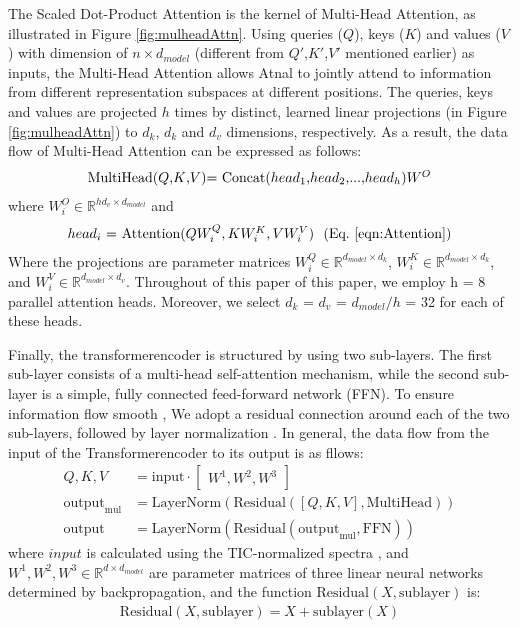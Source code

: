 \documentclass[journal=jacsat,manuscript=article]{achemso}
\begin{document}
The Scaled Dot-Product Attention is the kernel of Multi-Head Attention, as illustrated in Figure \ref{fig:mulheadAttn}. 
Using queries ($Q$), keys ($K$) and values ($V$) with dimension of $n \times d_{model}$ (different from $Q'$,$K'$,$V'$ mentioned earlier) as inputs,
the Multi-Head Attention allows Atnal to jointly attend to information from different representation subspaces 
at different positions. The queries, 
keys and values are projected  $h$ times by distinct, learned linear projections (in Figure \ref{fig:mulheadAttn})
to $d_k$, $d_k$ and $d_v$ dimensions, respectively. 
As a result, the data flow of Multi-Head Attention can be expressed as follows:
\begin{equation}
  \begin{minipage}[c]{0.80\linewidth}
    \centering
    MultiHead($Q$,$K$,$V$)= Concat($head_1$,$head_2$,...,$head_h$)$W^O $              \\
  \end{minipage}
  \label{eqn:MultiHeadAttn}
\end{equation}
where $W_i^O \in \mathbb{R}^{hd_v \times d_{model}}$ and 
\begin{equation}
  \begin{minipage}[c]{0.80\linewidth}
    \centering
    $head_i$ = Attention($QW_i^Q,KW_i^K,VW_i^V$) \,\,(Eq.~\ref{eqn:Attention})
  \end{minipage}
\end{equation}
Where the projections are parameter matrices 
$W_i^Q \in \mathbb{R}^{d_{model} \times d_k}$,
$W_i^K \in \mathbb{R}^{d_{model} \times d_k}$, and
$W_i^V \in \mathbb{R}^{d_{model} \times d_v}$. 
Throughout of this paper of this paper, we employ h = 8 parallel attention heads. Moreover, 
we select $d_k$ = $d_v$ = $d_{model}/h$ = 32 for each of these heads. 

Finally, the transformerencoder is structured by using two sub-layers. The first sub-layer 
consists of a multi-head self-attention mechanism, 
while the second sub-layer is a simple, fully connected feed-forward network (FFN). 
To ensure information flow smooth , 
We adopt a residual connection \cite{he2016deep} around each of the two sub-layers, 
followed by layer normalization \cite{hochreiter2001gradient}.
In general, the data flow from the input
of the Transformerencoder to its output is as fllows:
\begin{align}
  Q,K,V &= \text{input} \cdot \begin{bmatrix} W^1,W^2,W^3 \end{bmatrix} \\
  \text{output}_{\text{mul}} &= \text{LayerNorm}(\text{Residual}([Q,K,V],\text{MultiHead})) \\
  \text{output} &= \text{LayerNorm}(\text{Residual}(\text{output}_{\text{mul}},\text{FFN}))
\end{align}
where $input $ is calculated using the TIC-normalized spectra , and $W^1,W^2,W^3 \in \mathbb{R}^{d \times d_{model}}$  
are parameter matrices of three linear neural networks determined by 
backpropagation, and the function $\mathrm{Residual}(X,\text{sublayer})$ is:
\begin{align}
 \mathrm{Residual}(X,\text{sublayer}) = X + \text{sublayer}(X)
\end{align}
\end{document}
